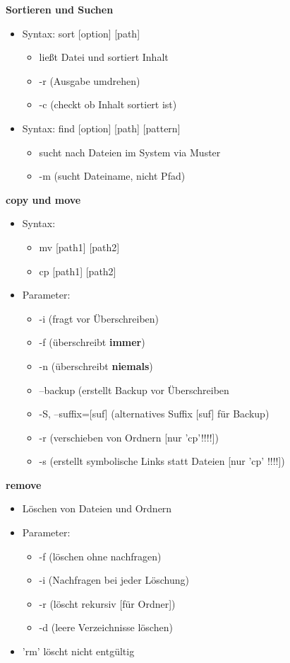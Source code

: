 \documentclass[12pt,utf8, 10pt]{article}
\begin{document}
\textbf{Sortieren und Suchen}
\begin{itemize}
	\item Syntax: sort [option] [path]
	\begin{itemize}
		\item ließt Datei und sortiert Inhalt
		\item -r (Ausgabe umdrehen)
		\item -c (checkt ob Inhalt sortiert ist)
	\end{itemize}
	\item Syntax: find [option] [path] [pattern]
	\begin{itemize}
		\item sucht nach Dateien im System via Muster
		\item -m (sucht Dateiname, nicht Pfad)
	\end{itemize}
\end{itemize}

\textbf{copy und move}
\begin{itemize}
	\item Syntax:
	\begin{itemize}
		\item mv [path1] [path2]
		\item cp [path1] [path2]
	\end{itemize}
	\item Parameter:
	\begin{itemize}
		\item -i (fragt vor Überschreiben)
		\item -f (überschreibt \textbf{immer})
		\item -n (überschreibt \textbf{niemals})
		\item --backup (erstellt Backup vor Überschreiben
		\item -S, --suffix=[suf] (alternatives Suffix [suf] für Backup)
		\item -r (verschieben von Ordnern [nur 'cp'!!!!])
		\item -s (erstellt symbolische Links statt Dateien [nur 'cp' !!!!])
	\end{itemize}
\end{itemize}

\textbf{remove}
\begin{itemize}
	\item Löschen von Dateien und Ordnern
	\item Parameter:	
	\begin{itemize}
		\item -f (löschen ohne nachfragen)
		\item -i (Nachfragen bei jeder Löschung)
		\item -r (löscht rekursiv [für Ordner])
		\item -d (leere Verzeichnisse löschen)
	\end{itemize}
	\item 'rm' löscht nicht entgültig
\end{itemize}
\end{document}
